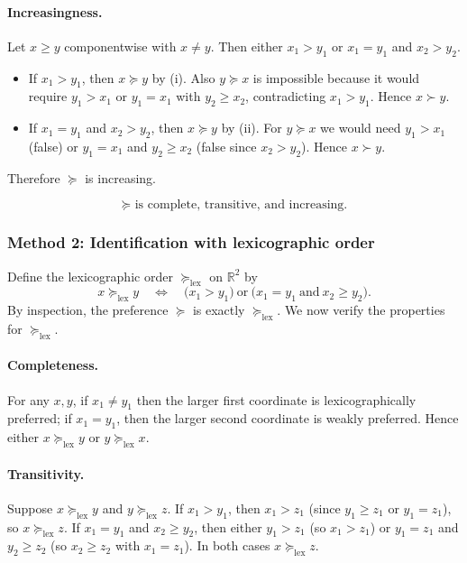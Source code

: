 \documentclass[12pt]{article}
\begin{document}
\paragraph{Increasingness.}
Let \(x\ge y\) componentwise with \(x\neq y\). Then either \(x_1>y_1\) or \(x_1=y_1\) and \(x_2>y_2\).
\begin{itemize}[leftmargin=*]
\item If \(x_1>y_1\), then \(x\succeq y\) by (i). Also \(y\succeq x\) is impossible because it would require \(y_1>x_1\) or \(y_1=x_1\) with \(y_2\ge x_2\), contradicting \(x_1>y_1\). Hence \(x\succ y\).
\item If \(x_1=y_1\) and \(x_2>y_2\), then \(x\succeq y\) by (ii). For \(y\succeq x\) we would need \(y_1>x_1\) (false) or \(y_1=x_1\) and \(y_2\ge x_2\) (false since \(x_2>y_2\)). Hence \(x\succ y\).
\end{itemize}
Therefore \(\succeq\) is increasing.

\[
\boxed{\text{\(\succeq\) is complete, transitive, and increasing.}}
\]

\subsubsection*{Method 2: Identification with lexicographic order}
Define the lexicographic order \(\succeq_{\mathrm{lex}}\) on \(\mathbb{R}^2\) by
\[
x\succeq_{\mathrm{lex}} y
\quad\Longleftrightarrow\quad
\bigl(x_1>y_1\bigr)\ \text{or}\ \bigl(x_1=y_1\ \text{and}\ x_2\ge y_2\bigr).
\]
By inspection, the preference \(\succeq\) is exactly \(\succeq_{\mathrm{lex}}\). We now verify the properties for \(\succeq_{\mathrm{lex}}\).

\paragraph{Completeness.}
For any \(x,y\), if \(x_1\neq y_1\) then the larger first coordinate is lexicographically preferred; if \(x_1=y_1\), then the larger second coordinate is weakly preferred. Hence either \(x\succeq_{\mathrm{lex}} y\) or \(y\succeq_{\mathrm{lex}} x\).

\paragraph{Transitivity.}
Suppose \(x\succeq_{\mathrm{lex}} y\) and \(y\succeq_{\mathrm{lex}} z\).
If \(x_1>y_1\), then \(x_1>z_1\) (since \(y_1\ge z_1\) or \(y_1=z_1\)), so \(x\succeq_{\mathrm{lex}} z\).
If \(x_1=y_1\) and \(x_2\ge y_2\), then either \(y_1>z_1\) (so \(x_1>z_1\)) or \(y_1=z_1\) and \(y_2\ge z_2\) (so \(x_2\ge z_2\) with \(x_1=z_1\)). In both cases \(x\succeq_{\mathrm{lex}} z\).
\end{document}
